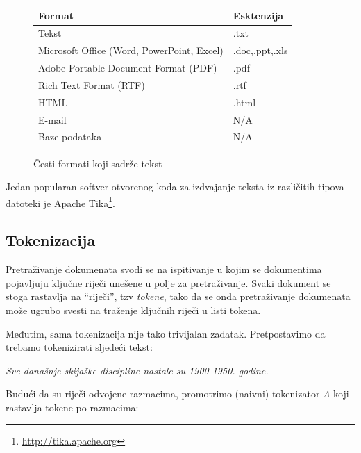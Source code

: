\documentclass[a4paper,twoside,12pt]{scrreprt}
\begin{document}
{\renewcommand{\arraystretch}{1.2}
\begin{figure}[H]
  \centering
  \begin{tabular}{|l|l|}
    \hline
    \textbf{Format}                            & \textbf{Esktenzija} \\
    \hline
    Tekst                                      & .txt                \\
    \hline
    Microsoft Office (Word, PowerPoint, Excel) & .doc,.ppt,.xls      \\
    \hline
    Adobe Portable Document Format (PDF)       & .pdf                \\
    \hline
    Rich Text Format (RTF)                     & .rtf                \\
    \hline
    HTML                                       & .html               \\
    \hline
    E-mail                                     & N/A                 \\
    \hline
    Baze podataka                              & N/A                 \\
    \hline
  \end{tabular}
  \caption{Česti formati koji sadrže tekst}
  \label{formats}
\end{figure}
}

Jedan popularan softver otvorenog koda za izdvajanje teksta iz različitih tipova datoteki je Apache Tika\footnote{\url{http://tika.apache.org}}.

\subsection{Tokenizacija}

Pretraživanje dokumenata svodi se na ispitivanje u kojim se dokumentima pojavljuju ključne riječi unešene u polje za pretraživanje. Svaki dokument se stoga rastavlja na ``riječi'', tzv \textit{tokene}, tako da se onda pretraživanje dokumenata može ugrubo svesti na traženje ključnih riječi u listi tokena.

Međutim, sama tokenizacija nije tako trivijalan zadatak. Pretpostavimo da trebamo tokenizirati sljedeći tekst:

\begin{quoting}
  \textit{Sve današnje skijaške discipline nastale su 1900-1950. godine.}
\end{quoting}

Budući da su riječi odvojene razmacima, promotrimo (naivni) tokenizator \textit{A} koji rastavlja tokene po razmacima:
\end{document}
